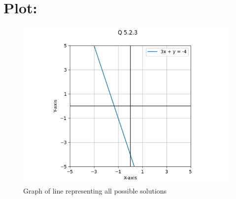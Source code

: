 \documentclass[a4paper, 12pt]{article}
\begin{document}
\section{Plot: }
\begin{figure}[h!]
    \centering
    \includegraphics[width=\columnwidth]{figs/plot.png}
    \caption{Graph of line representing all possible solutions}
    \label{fig:5.2.3}
\end{figure}
\end{document}
